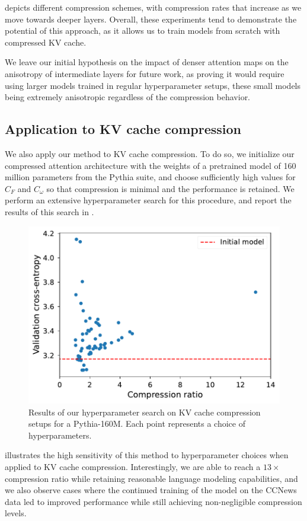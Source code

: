  depicts different compression schemes, with compression rates that increase as we move towards deeper layers. Overall, these experiments tend to demonstrate the potential of this approach, as it allows us to train models from scratch with compressed KV cache. 

We leave our initial hypothesis on the impact of denser attention maps on the anisotropy of intermediate layers for future work, as proving it would require using larger models trained in regular hyperparameter setups, these small models being extremely anisotropic regardless of the compression behavior.

\subsection{Application to KV cache compression}

We also apply our method to KV cache compression. To do so, we initialize our compressed attention architecture with the weights of a pretrained model of 160 million parameters from the Pythia suite, and choose sufficiently high values for $C_F$ and $C_\omega$ so that compression is minimal and the performance is retained. We perform an extensive hyperparameter search for this procedure, and report the results of this search in .

\begin{figure}[!ht]
    \centering
     \includegraphics[width=0.6\linewidth]{sources/part_2/kv_cache/imgs/hp_search_kvc_160m.pdf}
    \caption{Results of our hyperparameter search on KV cache compression setups for a Pythia-160M. Each point represents a choice of hyperparameters.}
    \label{fig:hp_search_kvc}
\end{figure}

 illustrates the high sensitivity of this method to hyperparameter choices when applied to KV cache compression. Interestingly, we are able to reach a $13 \times$ compression ratio while retaining reasonable language modeling capabilities, and we also observe cases where the continued training of the model on the CCNews data led to improved performance while still achieving non-negligible compression levels.

